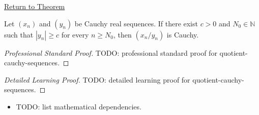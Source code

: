 \newpage
{}
\label{prf:quotient-cauchy-sequences}

\begin{remark*}[Return]
\hyperref[thm:quotient-cauchy-sequences]{Return to Theorem}
\end{remark*}

\begin{theorem*}
Let $(x_n)$ and $(y_n)$ be Cauchy real sequences. If there exist $c>0$
and $N_0\in\mathbb{N}$ such that $|y_n|\ge c$ for every $n\ge N_0$,
then $(x_n/y_n)$ is Cauchy.

\smallskip
\noindent
\end{theorem*}

\begin{proof}[Professional Standard Proof]
\LRAProofBodyStart
TODO: professional standard proof for quotient-cauchy-sequences.
\end{proof}

\begin{proof}[Detailed Learning Proof]
\LRAProofBodyStart
TODO: detailed learning proof for quotient-cauchy-sequences.
\end{proof}

\begin{remark*}
\end{remark*}

\begin{dependencies}
\begin{itemize}
  \item TODO: list mathematical dependencies.
\end{itemize}
\end{dependencies}

\clearpage
